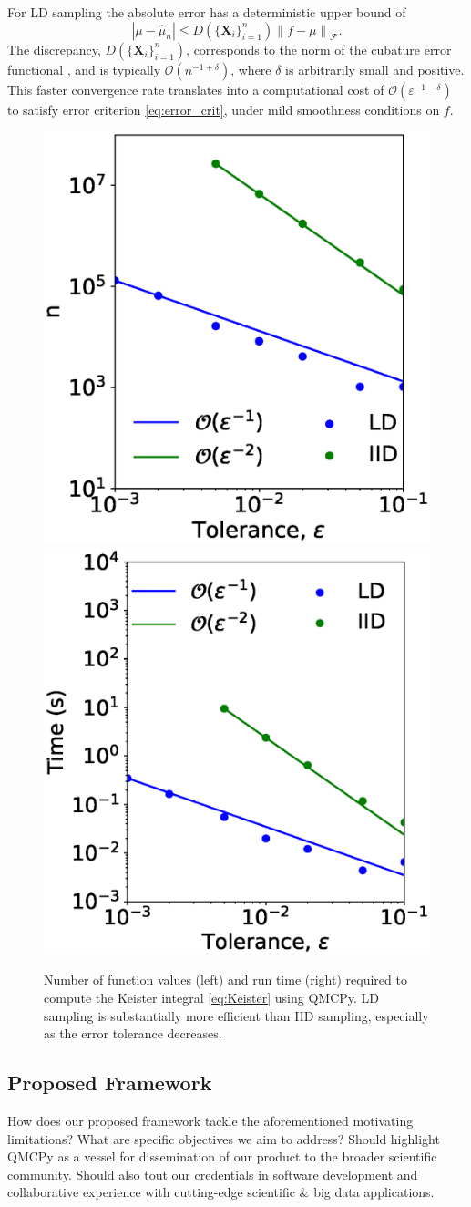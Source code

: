 \documentclass[11pt]{NSFamsart}
\newcommand{\cmtS}[1]{{\color{blue}{(Simon: #1)}}}
\newcommand{\bX}{{\boldsymbol{X}}}
\newcommand{\calf}{{\mathcal{F}}}
\def\abs#1{\ensuremath{\left \lvert #1 \right \rvert}}
\newcommand{\norm}[2][{}]{\ensuremath{\left \lVert #2 \right \rVert}_{#1}}
\newcommand{\Order}{\mathcal{O}}
\newcommand{\hmu}{\hat{\mu}}
\begin{document}
For LD sampling the absolute error has a deterministic  upper bound of \cite{Nie92,Hic99a}
\begin{equation} \label{eq:KH}
    \abs{\mu - \hmu_n} \le D(\{\bX_i\}_{i=1}^n) \norm[\calf]{f - \mu}.
\end{equation}
The discrepancy,  $D(\{\bX_i\}_{i=1}^n)$, corresponds to the norm of the cubature error functional \cite{Hic97a}, and is typically $\Order(n^{-1 + \delta})$, where $\delta$ is arbitrarily small and positive. This faster convergence rate translates into a computational cost of $\Order(\varepsilon^{-1-\delta})$ to satisfy error criterion \eqref{eq:error_crit}, under mild smoothness conditions on $f$.

\cmtS{clearly highlight limitations: scope of QMC (for broader scientific applications), practical considerations for gauging confidence.}

\begin{figure}
	\centering
	\includegraphics[height =0.24\textwidth]{ProgramsImages/keister_n.eps}
	\includegraphics[height =0.24\textwidth]{ProgramsImages/keister_timing.eps}
	\caption{Number of function values (left) and run time (right) required to compute the Keister integral \eqref{eq:Keister} using QMCPy.  LD sampling is substantially more efficient than IID sampling, especially as the error tolerance decreases.}
	\label{fig:KeisterTimes}
	\vspace{-0.3cm}
\end{figure}

\subsection{Proposed Framework} How does our proposed framework tackle the aforementioned motivating limitations? What are specific objectives we aim to address? Should highlight QMCPy as a vessel for dissemination of our product to the broader scientific community. Should also tout our credentials in software development and collaborative experience with cutting-edge scientific \& big data applications.
\end{document}
